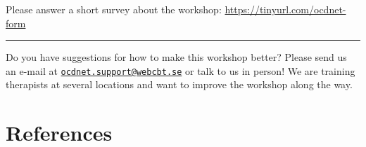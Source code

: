 \documentclass[]{book}
\begin{document}
Please answer a short survey about the workshop: \url{https://tinyurl.com/ocdnet-form}

\begin{center}\rule{0.5\linewidth}{\linethickness}\end{center}

Do you have suggestions for how to make this workshop better? Please send us an e-mail at \href{mailto:ocdnet.support@webcbt.se}{\nolinkurl{ocdnet.support@webcbt.se}} or talk to us in person! We are training therapists at several locations and want to improve the workshop along the way.

\hypertarget{references}{%
\chapter{References}\label{references}}


\end{document}

